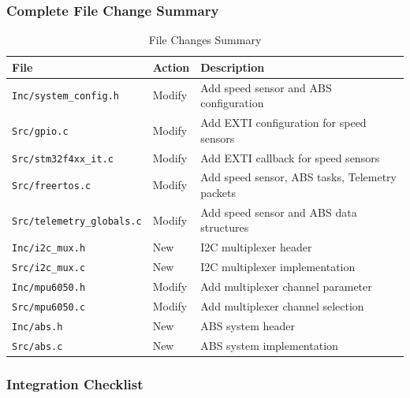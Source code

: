\documentclass[11pt,a4paper]{article}
\begin{document}
\subsubsection{Complete File Change Summary}

\begin{table}[H]
\centering
\begin{tabular}{@{}lll@{}}
\toprule
\textbf{File} & \textbf{Action} & \textbf{Description} \\
\midrule
\texttt{Inc/system\_config.h} & Modify & Add speed sensor and ABS configuration \\
\texttt{Src/gpio.c} & Modify & Add EXTI configuration for speed sensors \\
\texttt{Src/stm32f4xx\_it.c} & Modify & Add EXTI callback for speed sensors \\
\texttt{Src/freertos.c} & Modify & Add speed sensor, ABS tasks, Telemetry packets \\
\texttt{Src/telemetry\_globals.c} & Modify & Add speed sensor and ABS data structures \\
\texttt{Inc/i2c\_mux.h} & New & I2C multiplexer header \\
\texttt{Src/i2c\_mux.c} & New & I2C multiplexer implementation \\
\texttt{Inc/mpu6050.h} & Modify & Add multiplexer channel parameter \\
\texttt{Src/mpu6050.c} & Modify & Add multiplexer channel selection \\
\texttt{Inc/abs.h} & New & ABS system header \\
\texttt{Src/abs.c} & New & ABS system implementation \\
\bottomrule
\end{tabular}
\caption{File Changes Summary}
\end{table}

\subsubsection{Integration Checklist}
\end{document}

